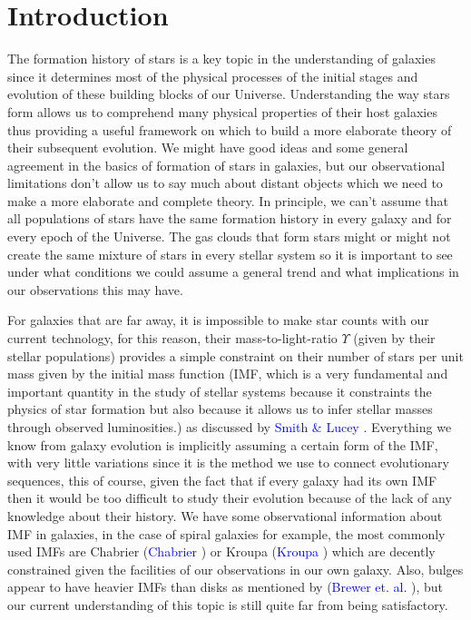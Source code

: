 \chapter{Introduction}

The  formation history of stars is a key topic in the understanding of galaxies since it determines most of the physical processes of the initial stages and evolution of these building blocks of our Universe. Understanding the way stars form allows us to comprehend many physical properties of their host galaxies thus providing a useful framework on which to build a more elaborate theory of their subsequent evolution. We might have good ideas and some general agreement in the basics of formation of stars in galaxies, but our observational limitations don't allow us to say much about distant objects which we need to make a more elaborate and complete theory. In principle, we can't assume that all populations of stars have the same formation history in every galaxy and for every epoch of the Universe. The gas clouds that form stars might or might not create the same mixture of stars in every stellar system so it is important to see under what conditions we could assume a general trend and what implications in our observations this may have.

For galaxies that are far away, it is impossible to make star counts with our current technology, for this reason, their mass-to-light-ratio $\Upsilon$ (given by their stellar populations) provides a simple constraint on their number of stars per unit mass given by the initial mass function  (IMF, which is a very fundamental and important quantity in the study of stellar systems because it constraints the physics of star formation but also because it allows us to infer stellar masses through observed luminosities.) as discussed by \textcolor{blue}{Smith \& Lucey} \citeyear{Reference7}. Everything we know from galaxy evolution is implicitly assuming a certain form of the IMF, with very little variations since it is the method we use to connect evolutionary sequences, this of course, given the fact that if every galaxy had its own IMF then it would be too difficult to study their evolution because of the lack of any knowledge about their history. We have some observational information about IMF in galaxies, in the case of spiral galaxies for example, the most commonly used IMFs are Chabrier (\textcolor{blue}{Chabrier} \citeyear{Reference31}) or Kroupa (\textcolor{blue}{Kroupa} \citeyear{Reference30}) which are decently constrained given the facilities of our observations in our own galaxy. Also, bulges appear to have heavier IMFs than disks as mentioned by (\textcolor{blue}{Brewer et. al.} \citeyear{Reference16}), but our current understanding of this topic is still quite far from being satisfactory.

